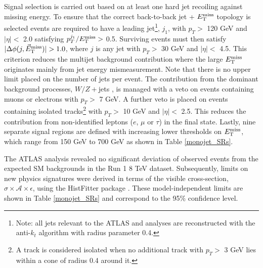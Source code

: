 Signal selection is carried out based on at least one hard jet recoiling against missing energy. To ensure that the correct back-to-back jet + $E_{\mathrm{T}}^{\mathrm{miss}}$ topology is selected events are required to have a leading jet\footnote{Note: all jets relevant to the ATLAS \monojet and \monoZ analyses are reconstructed with the anti-$k_t$ algorithm with radius parameter 0.4.}, $j_{1}$, with $p_{T} >$ 120 GeV and $|\eta| <$ 2.0 satisfying $p_{T}^{j_{1}}/E_{\mathrm{T}}^{\mathrm{miss}} >$ 0.5. Surviving events must then satisfy $|\Delta\phi(j,\metvec)|>1.0$, where $j$ is any jet with $p_{T} >$ 30 GeV and $|\eta| <$ 4.5. This criterion reduces the multijet background contribution where the large $E_{\mathrm{T}}^{\mathrm{miss}}$ originates mainly from jet energy mismeasurement. Note that there is no upper limit placed on the number of jets per event. The contribution from the dominant background processes, $W/Z+$jets 
, is managed with a veto on events containing muons or electrons with $p_{T}>$ 7 GeV. A further veto is placed on events containing isolated tracks\footnote{A track is considered isolated when no additional track with $p_{T} >$ 3 GeV lies within a cone of radius 0.4 around it.} with $p_{T}>$ 10 GeV and $|\eta| <$ 2.5. This reduces the contribution from non-identified leptons ($e$, $\mu$ or $\tau$) in the final state. Lastly, nine separate signal regions are defined with increasing lower thresholds on $E_{\mathrm{T}}^{\mathrm{miss}}$, which range from 150 GeV to 700 GeV as shown in Table \ref{monojet_SRs}.

The ATLAS \monojet analysis revealed no significant deviation of observed events from the expected SM backgrounds in the Run 1 8 TeV dataset. Subsequently, limits on new physics signatures were derived in terms of the visible cross-section, $\sigma\times\mathcal{A}\times\epsilon$, using the HistFitter package \cite{}. These model-independent limits are shown in Table \ref{monojet_SRs} and correspond to the 95\% confidence level.

